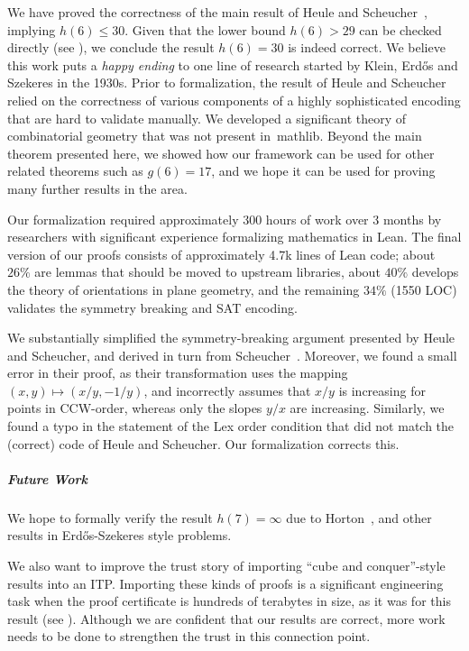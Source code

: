 We have proved the correctness of the main result of Heule and Scheucher~\cite{emptyHexagonNumber},
implying $h(6) \leq 30$.
Given that the lower bound $h(6) > 29$ can be checked directly (see \cite{emptyHexagonNumber}),
we conclude the result $h(6) = 30$ is indeed correct.
We believe this work puts a \emph{happy ending} to
one line of research started by Klein, Erd\H{o}s and Szekeres in the 1930s.
Prior to formalization, the result of Heule and Scheucher
relied on the correctness of various components of a highly sophisticated encoding
that are hard to validate manually.
We developed a significant theory of combinatorial geometry
that was not present in~\textsf{mathlib}.
Beyond the main theorem presented here,
we showed how our framework can be used for other related theorems
such as $g(6) = 17$,
and we hope it can be used for proving many further results in the area.

Our formalization required approximately 300 hours of work over 3 months
by researchers with significant experience formalizing mathematics in Lean.
The final version of our proofs consists of approximately 4.7k lines of Lean code;
about $26\%$ are lemmas that should be moved to upstream libraries,
about $40\%$ develops the theory of orientations in plane geometry,
and the remaining $34\%$ (1550 LOC) validates the symmetry breaking and SAT encoding.

We substantially simplified the symmetry-breaking argument presented by Heule and Scheucher,
and derived in turn from Scheucher~\cite{scheucherTwoDisjoint5holes2020}.
Moreover, we found a small error in their proof,
as their transformation uses the mapping $(x, y) \mapsto (x/y, -1/y)$,
and incorrectly assumes that $x/y$ is increasing for points in CCW-order,
whereas only the slopes $y/x$ are increasing.
Similarly, we found a typo in the statement of the \textsf{Lex order} condition
that did not match the (correct) code of Heule and Scheucher.
Our formalization corrects this.

\subparagraph*{Future Work}
We hope to formally verify the result $h(7) = \infty$ due to Horton~\cite{hortonSetsNoEmpty1983},
and other results in Erd\H{o}s-Szekeres style problems.

We also want to improve the trust story of importing ``cube and conquer''-style results into an ITP.
Importing these kinds of proofs is a significant engineering task
when the proof certificate is hundreds of terabytes in size,
as it was for this result (see ).
Although we are confident that our results are correct,
more work needs to be done to strengthen the trust in this connection point.
